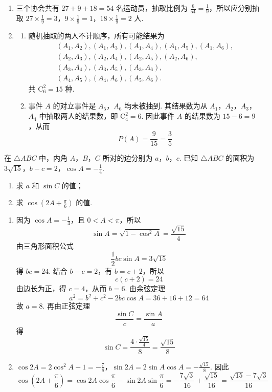 \begin{solution}
\begin{enumerate}
\item 三个协会共有 \(27+9+18=54\) 名运动员，抽取比例为 \(\frac{6}{54}=\frac{1}{9}\)，所以应分别抽取
\(27\times\frac19=3\)，\(9\times\frac19=1\)，\(18\times\frac19=2\)
人.

\item
\begin{enumerate}
\item 随机抽取的两人不计顺序，所有可能结果为
\[
\begin{gathered}
(A_1,A_2),(A_1,A_3),(A_1,A_4),(A_1,A_5),(A_1,A_6),\\
(A_2,A_3),(A_2,A_4),(A_2,A_5),(A_2,A_6),\\
(A_3,A_4),(A_3,A_5),(A_3,A_6),\\
(A_4,A_5),(A_4,A_6),(A_5,A_6).
\end{gathered}
\]
共 \(\mathrm C_6^2=15\) 种.

\item 事件 \(A\) 的对立事件是 \(A_5\)，\(A_6\) 均未被抽到. 其结果数为从 \(A_1\)，\(A_2\)，\(A_3\)，\(A_4\) 中抽取两人的结果数，即 \(\mathrm C_4^2=6\). 因此事件 \(A\) 的结果数为 \(15-6=9\)，从而
\[
P(A)=\frac9{15}=\frac35
\]
\end{enumerate}
\end{enumerate}
\end{solution}

\begin{problem}
在 \(\triangle ABC\) 中，内角 \(A\)，\(B\)，\(C\) 所对的边分别为 \(a\)，\(b\)，\(c\). 已知 \(\triangle ABC\) 的面积为 \(3\sqrt{15}\)，\(b - c = 2\)，\(\cos A = -\frac{1}{4}\).
\begin{enumerate}
\item 求 \(a\) 和 \( \sin C \) 的值；
\item 求 \( \cos\left(2A+\frac{\pi}{6}\right) \) 的值.
\end{enumerate}
\end{problem}

\begin{solution}
\begin{enumerate}
\item 因为 \(\cos A=-\frac14\)，且 \(0<A<\pi\)，所以
\[
\sin A=\sqrt{1-\cos^2A}=\frac{\sqrt{15}}4
\]
由三角形面积公式
\[
\frac12bc\sin A=3\sqrt{15}
\]
得 \(bc=24\). 结合 \(b-c=2\)，有 \(b=c+2\)，所以
\[
c(c+2)=24
\]
由边长为正，得 \(c=4\)，从而 \(b=6\). 由余弦定理
\[
a^2=b^2+c^2-2bc\cos A=36+16+12=64
\]
故 \(a=8\). 再由正弦定理
\[
\frac{\sin C}{c}=\frac{\sin A}{a}
\]
得
\[
\sin C=\frac{4\cdot\frac{\sqrt{15}}4}{8}=\frac{\sqrt{15}}8
\]

\item
\(\cos2A=2\cos^2A-1=-\frac78\)，\(\sin2A=2\sin A\cos A=-\frac{\sqrt{15}}8\).
因此
\[
\cos\left(2A+\frac\pi6\right)=\cos2A\cos\frac\pi6-\sin2A\sin\frac\pi6
=-\frac{7\sqrt3}{16}+\frac{\sqrt{15}}{16}
=\frac{\sqrt{15}-7\sqrt3}{16}
\]
\end{enumerate}
\end{solution}

